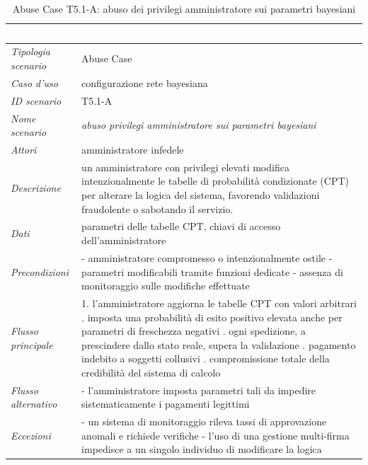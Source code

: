 \begin{longtable}{| >{\columncolor{abuseCol}}p{} | p{} |}
\caption{Abuse Case T5.1-A: abuso dei privilegi amministratore sui parametri bayesiani}\label{tab:t51a}\\
\hline
\rowcolor{abuseHeader} \textcolor{white}{\textit{Campo}} & \textcolor{white}{\textit{Contenuto}} \\
\hline
\textit{Tipologia scenario} & Abuse Case \\
\hline
\textit{Caso d'uso} & configurazione rete bayesiana \\
\hline
\textit{ID scenario} & T5.1-A \\
\hline
\textit{Nome scenario} & \textit{abuso privilegi amministratore sui parametri bayesiani} \\
\hline
\textit{Attori} & amministratore infedele \\
\hline
\textit{Descrizione} & un amministratore con privilegi elevati modifica intenzionalmente le tabelle di probabilità condizionate (CPT) per alterare la logica del sistema, favorendo validazioni fraudolente o sabotando il servizio. \\
\hline
\textit{Dati} & parametri delle tabelle CPT, chiavi di accesso dell'amministratore \\
\hline
\textit{Precondizioni} & - amministratore compromesso o intenzionalmente ostile \newline - parametri modificabili tramite funzioni dedicate \newline - assenza di monitoraggio sulle modifiche effettuate \\
\hline
\textit{Flusso principale} & 1. l'amministratore aggiorna le tabelle CPT con valori arbitrari \newline 2. imposta una probabilità di esito positivo elevata anche per parametri di freschezza negativi \newline 3. ogni spedizione, a prescindere dallo stato reale, supera la validazione \newline 4. pagamento indebito a soggetti collusivi \newline 5. compromissione totale della credibilità del sistema di calcolo \\
\hline
\textit{Flusso alternativo} & - l'amministratore imposta parametri tali da impedire sistematicamente i pagamenti legittimi \\
\hline
\textit{Eccezioni} & - un sistema di monitoraggio rileva tassi di approvazione anomali e richiede verifiche \newline - l'uso di una gestione multi-firma impedisce a un singolo individuo di modificare la logica \\

\end{longtable}
